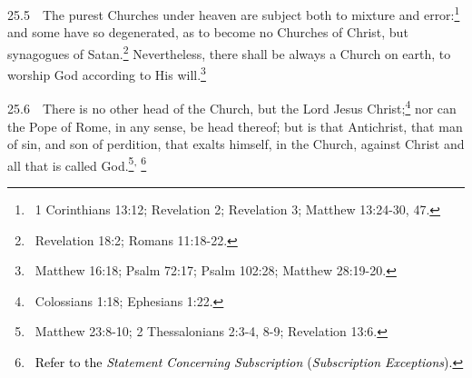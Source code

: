 {{{{{{{{{{{{25.5\ \ The purest Churches under heaven are subject both to mixture and
error:\footnote{\ 1 Corinthians 13:12; Revelation 2; Revelation 3;
Matthew 13:24-30, 47.} and some have so
degenerated, as to become no Churches of Christ, but synagogues of Satan.\footnote{\ Revelation 18:2; Romans 11:18-22.} Nevertheless, there shall be always a
Church on earth, to worship God
according to His will.\footnote{\ Matthew 16:18; Psalm 72:17; Psalm 102:28; Matthew 28:19-20.}


\bigskip

25.6\ \ There is no other head of the Church, but the Lord Jesus
Christ;\footnote{\ Colossians 1:18; Ephesians 1:22.} nor can the Pope of Rome, in any sense, be head
thereof; but is that Antichrist, that man of
sin, and son of perdition, that exalts himself, in
the Church, against Christ and all that is called God.\footnote{\ Matthew
23:8-10; 2 Thessalonians 2:3-4, 8-9; Revelation 13:6.}\textsuperscript{,}
\footnote{\ \textcolor{black}{Refer to the }\textit{\textcolor{black}{Statement Concerning Subscription
}}\textcolor{black}{(}\textit{\textcolor{black}{Subscription Exceptions}}\textcolor{black}{).}}

}}}}}}}}}}}}
